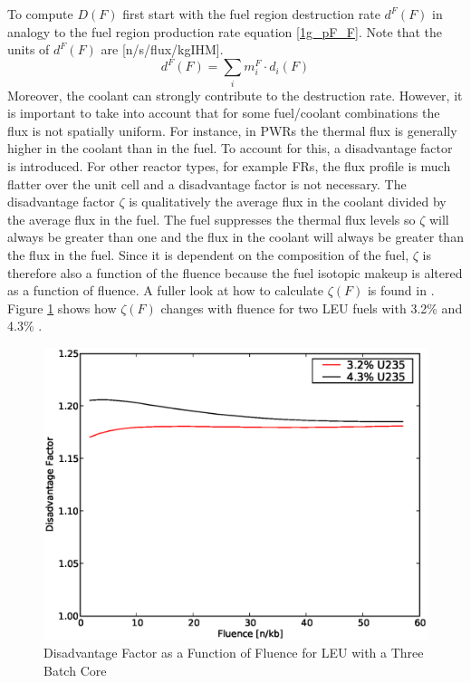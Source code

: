 To compute $D(F)$ first start with the fuel region 
destruction rate $d^F(F)$ in analogy to the fuel region production rate equation \ref{1g_pF_F}.  Note that the 
units of $d^F(F)$ are [n/s/flux/kgIHM].  
\begin{equation}
\label{1g_dF_F}
d^F(F) = \sum_i m_i^F \cdot d_i(F)
\end{equation}
Moreover, the coolant can strongly contribute to the destruction rate.  However, it is 
important to take into account that for some fuel/coolant combinations the flux is not 
spatially uniform.  For instance, in PWRs the thermal flux is generally higher in the coolant 
than in the fuel. To account for this, a disadvantage factor is introduced.  For other reactor 
types, for example FRs, the flux profile is much flatter over the unit cell and a disadvantage 
factor is not necessary. The disadvantage factor $\zeta$ is qualitatively the average flux in 
the coolant divided by the average flux in the fuel. The fuel suppresses the thermal flux 
levels so $\zeta$ will always be greater than one and the flux in the coolant will always 
be greater than the flux in the fuel. Since it is dependent on the composition of the fuel, $\zeta$ 
is therefore also a function of the fluence because the fuel isotopic makeup is altered as a function 
of fluence. A fuller look at how to calculate $\zeta(F)$ is found in \cite{Lamarsh2002}.  Figure \ref{1g_fig04} 
shows how $\zeta(F)$ changes with fluence for two LEU fuels with 3.2\% and 4.3\% . 
\begin{figure}[htbp]
\caption{Disadvantage Factor as a Function of Fluence for LEU with a Three Batch Core}
\label{1g_fig04}
\begin{center}
\includegraphics[scale=0.5]{one_group_method/figs/Fig04.eps}
\end{center}
\end{figure}
